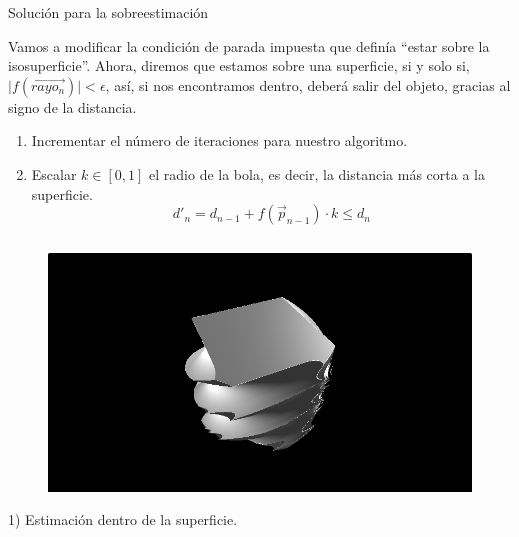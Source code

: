 \begin{frame}{Solución para la sobreestimación}
    
    Vamos a modificar la condición de parada impuesta que definía \enquote{estar sobre la isosuperficie}. Ahora, diremos que estamos sobre una superficie, si y solo si, \( \vert f(\Vec{rayo_{n}}) \vert < \epsilon\), así, si nos encontramos dentro, deberá salir del objeto, gracias al signo de la distancia.
    
    \vfill
    
    \begin{enumerate}
        \item Incrementar el número de iteraciones para nuestro algoritmo.
        \item Escalar \(k\in[0,1]\) el radio de la bola, es decir, la distancia más corta a la superficie.
        \[d'_{n}=d_{n-1} + f(\Vec{p}_{n-1})\cdot k \leq d_{n}\]
    \end{enumerate}
    
    \vfill
    
    \begin{columns}[onlytextwidth]
        \begin{column}{0.45\textwidth}
            \begin{figure}[H]
              \centering
              \includegraphics[width=1.0\textwidth]{imagenes/sdf/3d/sdf_twist.png}
            \end{figure}
            {\small 1) Estimación dentro de la superficie.}
        \end{column}
        

\end{columns}
\end{frame}

